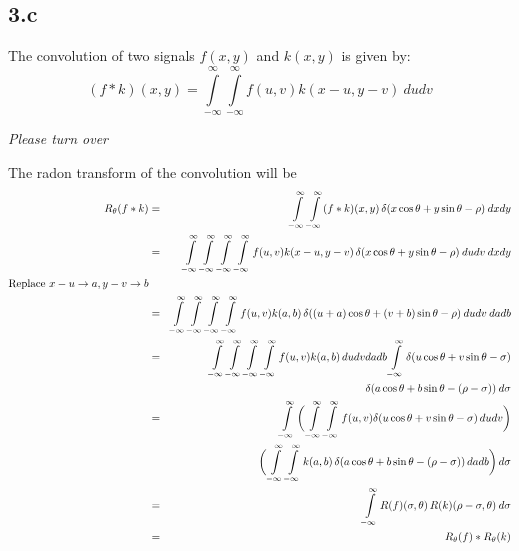 \documentclass[12pt]{article}
\begin{document}
\subsection*{3.c}
The convolution of two signals $f(x, y)$ and $k(x, y)$ is given by:
$$(f * k)(x, y) = \int \limits_{-\infty}^\infty \int \limits_{-\infty}^\infty f(u, v) k(x-u, y-v)\: dudv$$
\vspace{3cm}
\begin{center}
\textit{Please turn over}
\end{center}
\newpage
The radon transform of the convolution will be
\begin{eqnarray*}
	R_\theta(f*k) &=& \int \limits_{-\infty}^\infty \int \limits_{-\infty}^ \infty (f*k)(x, y)\, \delta(x \cos \theta + y \sin \theta - \rho)\: dxdy\\
	&=& \int \limits_{-\infty}^\infty \int \limits_{-\infty}^ \infty \int \limits_{-\infty}^\infty \int \limits_{-\infty}^ \infty f(u, v) k(x-u, y-v)\, \delta(x \cos \theta + y \sin \theta - \rho)\: dudv\: dxdy\\
	\text{Replace } x-u \rightarrow a, y-v \rightarrow b&&\\
	&=& \int \limits_{-\infty}^\infty \int \limits_{-\infty}^ \infty \int \limits_{-\infty}^\infty \int \limits_{-\infty}^ \infty  f(u, v) k(a, b) \, \delta((u+a)\cos\theta + (v+b)\sin \theta - \rho)\: dudv\: dadb\\
	&=& \int \limits_{-\infty}^\infty \int \limits_{-\infty}^ \infty \int \limits_{-\infty}^\infty \int \limits_{-\infty}^ \infty f(u, v) k(a, b) \, dudvdadb \int \limits_{-\infty}^\infty \delta(u\cos\theta + v\sin\theta - \sigma)\\
	&&\hskip 12em\delta(a\cos\theta + b\sin\theta - (\rho-\sigma))\: d\sigma\\
	&=& \int \limits_{-\infty}^\infty \bigg(\int \limits_{-\infty}^\infty\int \limits_{-\infty}^\infty f(u,v) \delta(u\cos\theta + v\sin\theta - \sigma)\, dudv\bigg)\\
	&&\bigg(\int \limits_{-\infty}^\infty\int \limits_{-\infty}^\infty k(a, b)\,\delta(a\cos\theta + b\sin\theta - (\rho-\sigma))\,dadb \bigg)\, d\sigma\\
	&=&  \int \limits_{-\infty}^\infty R(f)(\sigma, \theta) \, R(k)(\rho - \sigma, \theta)\: d\sigma\\
	&=& R_\theta(f) * R_\theta(k)
\end{eqnarray*}
\end{document}
